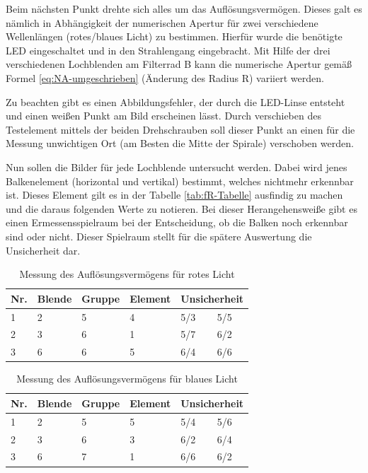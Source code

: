 \documentclass[12pt,a4paper,twoside]{article}
\begin{document}
Beim nächsten Punkt drehte sich alles um das Auflösungsvermögen. Dieses galt es nämlich in Abhängigkeit der numerischen Apertur für zwei verschiedene Wellenlängen (rotes/blaues Licht) zu bestimmen. 
Hierfür wurde die benötigte LED eingeschaltet und in den Strahlengang eingebracht. Mit Hilfe der drei verschiedenen Lochblenden am Filterrad B kann die numerische Apertur gemäß Formel \ref{eq:NA-umgeschrieben} (Änderung des Radius R) variiert werden. \newline

\noindent
Zu beachten gibt es einen Abbildungsfehler, der durch die LED-Linse entsteht und einen weißen Punkt am Bild erscheinen lässt. Durch verschieben des Testelement mittels der beiden Drehschrauben soll dieser Punkt an einen für die Messung unwichtigen Ort (am Besten die Mitte der Spirale) verschoben werden. \newline

\noindent
Nun sollen die Bilder für jede Lochblende untersucht werden. Dabei wird jenes Balkenelement (horizontal und vertikal) bestimmt, welches nichtmehr erkennbar ist. Dieses Element gilt es in der Tabelle \ref{tab:fR-Tabelle} ausfindig zu machen und die daraus folgenden Werte zu notieren.
Bei dieser Herangehensweiße gibt es einen Ermessensspielraum bei der Entscheidung, ob die Balken noch erkennbar sind oder nicht. Dieser Spielraum stellt für die spätere Auswertung die Unsicherheit dar.

\begin{table}[H]
    \centering
    \caption{Messung des Auflösungsvermögens für rotes Licht}
    \label{tab:BerechnungenLeerlauf}
    \begin{tabular}{| l | l | l | l | l | l |}
        \hline
        Nr. & Blende & Gruppe & Element & \multicolumn{2}{|c|}{Unsicherheit} \\
        \hline
        1 & 2 & 5 & 4 & 5/3 & 5/5 \\
        2 & 3 & 6 & 1 & 5/7 & 6/2 \\
        3 & 6 & 6 & 5 & 6/4 & 6/6 \\
        \hline
    \end{tabular}
\end{table}

\begin{table}[H]
    \centering
    \caption{Messung des Auflösungsvermögens für blaues Licht}
    \label{tab:BerechnungenLeerlauf}
    \begin{tabular}{| l | l | l | l | l | l |}
        \hline
        Nr. & Blende & Gruppe & Element & \multicolumn{2}{|c|}{Unsicherheit} \\
        \hline
        1 & 2 & 5 & 5 & 5/4 & 5/6 \\
        2 & 3 & 6 & 3 & 6/2 & 6/4 \\
        3 & 6 & 7 & 1 & 6/6 & 6/2 \\
        \hline
    \end{tabular}
\end{table}
\end{document}
